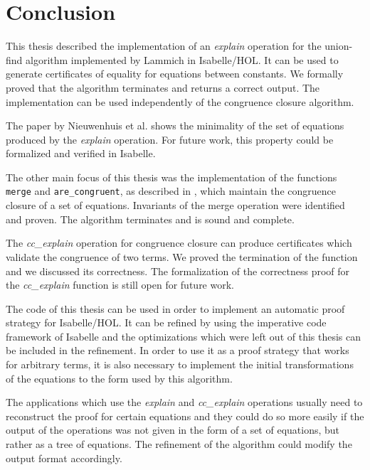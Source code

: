 
\chapter{Conclusion}\label{chapter:conclusion}

This thesis described the implementation of an \emph{explain} operation for the union-find algorithm implemented by Lammich \cite{unionfind-isabelle} in Isabelle/HOL. It can be used to generate certificates of equality for equations between constants. We formally proved that the algorithm terminates and returns a correct output. The implementation can be used independently of the congruence closure algorithm.

The paper by Nieuwenhuis et al. \cite{Nieuwenhuis} shows the minimality of the set of equations produced by the \emph{explain} operation. For future work, this property could be formalized and verified in Isabelle.

The other main focus of this thesis was the implementation of the functions \lstinline|merge| and \lstinline|are_congruent|, as described in \cite{Nieuwenhuis}, which maintain the congruence closure of a set of equations. Invariants of the merge operation were identified and proven. The algorithm terminates and is sound and complete.

The \emph{cc\_explain} operation for congruence closure can produce certificates which validate the congruence of two terms. We proved the termination of the function and we discussed its correctness.
The formalization of the correctness proof for the \emph{cc\_explain} function is still open for future work.

The code of this thesis can be used in order to implement an automatic proof strategy for Isabelle/HOL. It can be refined by using the imperative code framework of Isabelle \cite{imperativehol} and the optimizations which were left out of this thesis can be included in the refinement. In order to use it as a proof strategy that works for arbitrary terms, it is also necessary to implement the initial transformations of the equations to the form used by this algorithm.

The applications which use the \emph{explain} and \emph{cc\_explain} operations usually need to reconstruct the proof for certain equations and they could do so more easily if the output of the operations was not given in the form of a set of equations, but rather as a tree of equations. The refinement of the algorithm could modify the output format accordingly.
